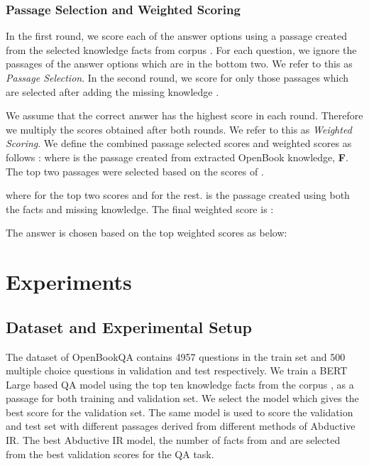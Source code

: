 \documentclass[11pt,a4paper]{article}
\begin{document}
\subsubsection{Passage Selection and Weighted Scoring}
In the first round,  we score each of the answer options using a passage created from the selected knowledge facts from corpus . For each question, we ignore the passages of the answer options which are in the bottom two. We refer to this as \textit{Passage Selection}. In the second round, we score for only those passages which are selected after adding the missing knowledge .

We assume that the correct answer has the highest score in each round. Therefore we multiply the scores obtained after both rounds. We refer to this as \textit{Weighted Scoring}.
We define the combined passage selected scores and weighted scores as follows :
 where  is the passage created from extracted OpenBook knowledge, \textbf{F}. The top two passages were selected based on the scores of  . 

where  for the top two scores and  for the rest.  is the passage created using both the facts and missing knowledge. The final weighted score is :

The answer is chosen based on the top weighted scores as below:



\section{Experiments}


\subsection{Dataset and Experimental Setup}
The dataset of OpenBookQA contains 4957 questions in the train set and 500 multiple choice questions in validation and test respectively.
We train a BERT Large based QA model using the top ten knowledge facts from the corpus , as a passage for both training and validation set. We select the model which gives the best score for the validation set. The same model is used to score the validation and test set with different passages derived from different methods of Abductive IR. The best Abductive IR model, the number of facts from  and  are selected from the best validation scores for the QA task.  
\end{document}
